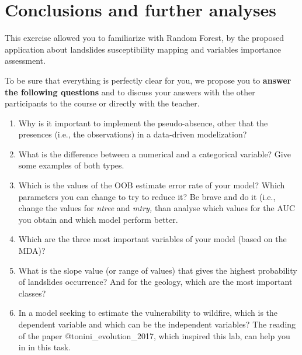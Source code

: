 \documentclass[
]{book}
\begin{document}
\hypertarget{conclusions-and-further-analyses-3}{%
\section{Conclusions and further analyses}\label{conclusions-and-further-analyses-3}}

This exercise allowed you to familiarize with Random Forest, by the proposed application about landslides susceptibility mapping and variables importance assessment.

To be sure that everything is perfectly clear for you, we propose you to \textbf{answer the following questions} and to discuss your answers with the other participants to the course or directly with the teacher.

\begin{enumerate}
\def\labelenumi{\arabic{enumi})}
\item
  Why is it important to implement the pseudo-absence, other that the presences (i.e., the observations) in a data-driven modelization?
\item
  What is the difference between a numerical and a categorical variable?
  Give some examples of both types.
\item
  Which is the values of the OOB estimate error rate of your model?
  Which parameters you can change to try to reduce it?
  Be brave and do it (i.e., change the values for \emph{ntree} and \emph{mtry,} than analyse which values for the AUC you obtain and which model perform better.
\item
  Which are the three most important variables of your model (based on the MDA)?
\item
  What is the slope value (or range of values) that gives the highest probability of landslides occurrence?
  And for the geology, which are the most important classes?
\item
  In a model seeking to estimate the vulnerability to wildfire, which is the dependent variable and which can be the independent variables?
  The reading of the paper @tonini\_evolution\_2017, which inspired this lab, can help you in in this task.
\end{enumerate}

  
\end{document}
